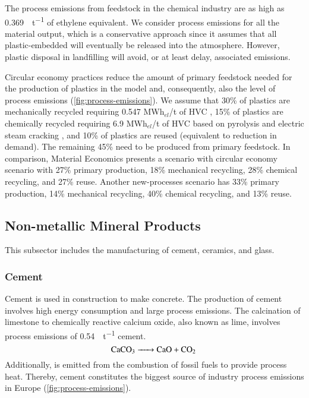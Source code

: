 The process emissions from feedstock in the chemical industry are as high as
\SI{0.369}{\tco\per\tonne} of ethylene equivalent. We consider process emissions
for all the material output, which is a conservative approach since it assumes
that all plastic-embedded \co will eventually be released into the atmosphere.
However, plastic disposal in landfilling will avoid, or at least delay,
associated \co emissions.

Circular economy practices reduce the amount of primary feedstock needed for the
production of plastics in the model and, consequently, also the level of process
emissions (\cref{fig:process-emissions}). We assume that 30\% of plastics are
mechanically recycled requiring 0.547 MWh$_{el}$/t of HVC
, 15\% of plastics are chemically recycled
requiring 6.9 MWh$_{el}$/t of HVC based on pyrolysis and electric steam cracking
, and 10\% of plastics are
reused (equivalent to reduction in demand). The remaining 45\% need to be
produced from primary feedstock. In comparison, Material Economics
 presents a scenario with circular economy scenario with
27\% primary production, 18\% mechanical recycling, 28\% chemical recycling, and
27\% reuse. Another new-processes scenario has 33\% primary production, 14\%
mechanical recycling, 40\% chemical recycling, and 13\% reuse.



\subsection{Non-metallic Mineral Products}
\label{sec:si:industry:nmmp}

This subsector includes the manufacturing of cement, ceramics, and glass.

\subsubsection*{Cement}

Cement is used in construction to make concrete. The production of cement
involves high energy consumption and large process emissions. The calcination of
limestone to chemically reactive calcium oxide, also known as lime, involves
process emissions of \SI{0.54}{\tco\per\tonne} cement.
\begin{equation}
    \ce{CaCO3 -> CaO + \co}
\end{equation}
Additionally, \co is emitted from the combustion of fossil fuels to provide
process heat. Thereby, cement constitutes the biggest source of industry
process emissions in Europe (\cref{fig:process-emissions}).

